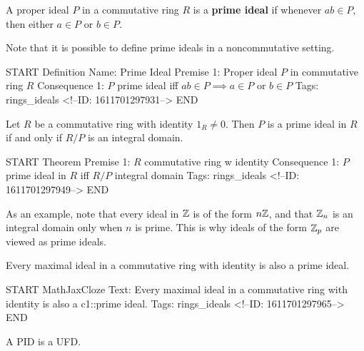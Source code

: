 \documentclass{memoir}
\begin{document}
\begin{defn}
	A proper ideal \(P\) in a commutative ring \(R\) is a \textbf{prime ideal} if whenever \(ab \in P\), then either \(a \in P\) or \(b \in P\).
\end{defn}
Note that it is possible to define prime ideals in a noncommutative setting.

\begin{anki}
START
Definition
Name: Prime Ideal
Premise 1: Proper ideal \(P\) in commutative ring \(R\)
Consequence 1: \(P\) prime ideal iff \(ab \in P \implies a \in P\) or \(b \in P\)
Tags: rings_ideals
<!--ID: 1611701297931-->
END
\end{anki}

\begin{prop}
	Let \(R\) be a commutative ring with identity \(1_R\neq 0\). Then \(P\) is a prime ideal in \(R\) if and only if \(R / P\) is an integral domain.
\end{prop}

\begin{anki}
START
Theorem
Premise 1: \(R\) commutative ring w identity
Consequence 1: \(P\) prime ideal in \(R\) iff \(R / P\) integral domain
Tags: rings_ideals
<!--ID: 1611701297949-->
END
\end{anki}

As an example, note that every ideal in \(\mathbb{Z}\) is of the form \(n\mathbb{Z}\), and that \(\mathbb{Z}_n\) is an integral domain only when \(n\) is prime. This is why ideals of the form \(\mathbb{Z}_p\) are viewed as prime ideals.
\begin{cor}
	Every maximal ideal in a commutative ring with identity is also a prime ideal.
\end{cor}

\begin{anki}
START
MathJaxCloze
Text: Every maximal ideal in a commutative ring with identity is also a {{c1::prime ideal}}. 
Tags: rings_ideals
<!--ID: 1611701297965-->
END
\end{anki}

\begin{thm}
	A PID is a UFD.
\end{thm}
\end{document}
